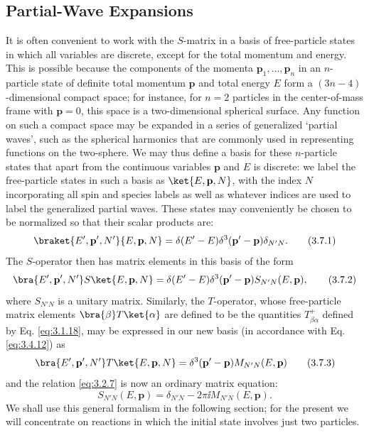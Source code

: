 \subsection[Partial-Wave Expansions]{Partial-Wave Expansions\texorpdfstring{\protect\footnotemark}{}}

It is often convenient to work with the $S$-matrix in a basis of free-particle
states in which all variables are discrete, except for the total momentum and
energy. This is possible because the components of the momenta
$\mathbf p_1,\ldots,\mathbf p_n$ in an $n$-particle state of definite total
momentum $\mathbf p$ and total energy $E$ form a $(3n-4)$-dimensional compact
space; for instance, for $n=2$ particles in the center-of-mass frame with
$\mathbf p=0$, this space is a two-dimensional spherical surface. Any
function on such a compact space may be expanded in a series of generalized
`partial waves', such as the spherical harmonics that are commonly used in
representing functions on the two-sphere. We may thus define a basis for these
$n$-particle states that apart from the continuous variables $\mathbf p$ and
$E$ is discrete: we label the free-particle states in such a basis as
$\ket{E,\mathbf p,N}$, with the index $N$ incorporating all spin and species
labels as well as whatever indices are used to label the generalized partial
waves. These states may conveniently be chosen to be normalized so that their
scalar products are:
\begin{equation}
  \braket{E',\mathbf p',N'}{E,\mathbf p,N}
  =\delta(E'-E)\delta^3(\mathbf p'-\mathbf p)\delta_{N'N}.
  \tag{3.7.1}\label{eq:3.7.1}
\end{equation}
The $S$-operator then has matrix elements in this basis of the form
\begin{equation}
  \bra{E',\mathbf p',N'}S\ket{E,\mathbf p,N}
  =\delta(E'-E)\delta^3(\mathbf p'-\mathbf p)
   S_{N'N}(E,\mathbf p),
  \tag{3.7.2}\label{eq:3.7.2}
\end{equation}
where $S_{N'N}$ is a unitary matrix. Similarly, the $T$-operator, whose
free-particle matrix elements $\bra{\beta}T\ket{\alpha}$ are defined to be
the quantities $T^+_{\beta\alpha}$ defined by Eq. \eqref{eq:3.1.18}, may be expressed
in our new basis (in accordance with Eq. \eqref{eq:3.4.12}) as
\begin{equation}
  \bra{E',\mathbf p',N'}T\ket{E,\mathbf p,N}
  =\delta^3(\mathbf p'-\mathbf p)M_{N'N}(E,\mathbf p)
  \tag{3.7.3}\label{eq:3.7.3}
\end{equation}
and the relation \eqref{eq:3.2.7} is now an ordinary matrix equation:
\begin{equation}
  S_{N'N}(E,\mathbf p)=\delta_{N'N}-2\pi \ii M_{N'N}(E,\mathbf p).
  \tag{3.7.4}\label{eq:3.7.4}
\end{equation}
We shall use this general formalism in the following section; for the present
we will concentrate on reactions in which the initial state involves just two
particles.

